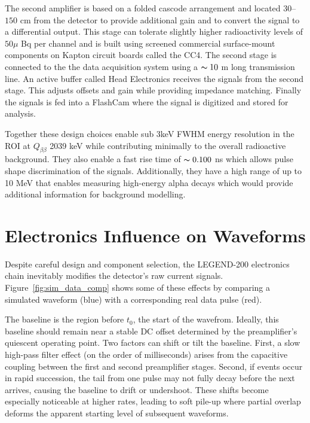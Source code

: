 The second amplifier is based on a folded cascode arrangement and located $30$–$150$ cm from the detector to provide additional gain and to convert the signal to a differential output. This stage can tolerate slightly higher radioactivity levels of $50\mu$ Bq per channel and is built using screened commercial surface-mount components on Kapton circuit boards called the CC4. The second stage is connected to the the data acquisition system using a $\thicksim 10$ m long transmission line. An active buffer called Head Electronics receives the signals from the second stage. This adjusts offsets and gain while providing impedance matching. Finally the signals is fed into a FlashCam where the signal is digitized and stored for analysis.

Together these design choices enable sub 3keV FWHM energy resolution in the ROI at $Q_{\beta\beta}$ 2039 keV while contributing minimally to the overall radioactive background. They also enable a fast rise time of $\thicksim 0.100$ ns which allows pulse shape discrimination of the signals. Additionally, they have a high range of up to 10 MeV that enables measuring high-energy alpha decays which would provide additional information for background modelling.

\section{Electronics Influence on Waveforms}

Despite careful design and component selection, the LEGEND-200 electronics chain inevitably modifies the detector’s raw current signals. Figure~\ref{fig:sim_data_comp} shows some of these effects by comparing a simulated waveform (blue) with a corresponding real data pulse (red).

The baseline is the region before $t_0$, the start of the wavefrom. Ideally, this baseline should remain near a stable DC offset determined by the preamplifier’s quiescent operating point. Two factors can shift or tilt the baseline. First, a slow high-pass filter effect (on the order of milliseconds) arises from the capacitive coupling between the first and second preamplifier stages. Second, if events occur in rapid succession, the tail from one pulse may not fully decay before the next arrives, causing the baseline to drift or undershoot. These shifts become especially noticeable at higher rates, leading to soft pile-up where partial overlap deforms the apparent starting level of subsequent waveforms. 

